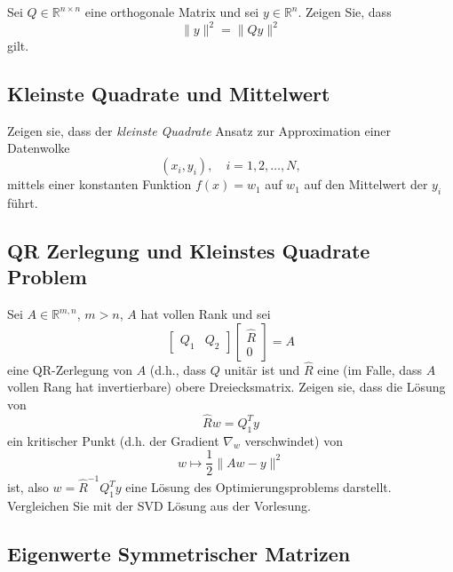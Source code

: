 \documentclass[
]{book}
\theoremstyle{definition}
\theoremstyle{definition}
\theoremstyle{definition}
\theoremstyle{definition}
\theoremstyle{remark}
\begin{document}
Sei \(Q\in \mathbb R^{n\times n}\) eine orthogonale Matrix und sei \(y\in \mathbb R^{n}\). Zeigen Sie, dass
\begin{equation*}
\|y\|^2 = \|Qy \|^2
\end{equation*}
gilt.

\hypertarget{kleinste-quadrate-und-mittelwert}{%
\subsection{Kleinste Quadrate und Mittelwert}\label{kleinste-quadrate-und-mittelwert}}

Zeigen sie, dass der \emph{kleinste Quadrate} Ansatz zur Approximation einer Datenwolke
\begin{equation*}
(x_i, y_i), \quad i=1,2,\dotsc,N,
\end{equation*}
mittels einer konstanten Funktion \(f(x)=w_1\) auf \(w_1\) auf den Mittelwert der \(y_i\) führt.

\hypertarget{qr-zerlegung-und-kleinstes-quadrate-problem}{%
\subsection{QR Zerlegung und Kleinstes Quadrate Problem}\label{qr-zerlegung-und-kleinstes-quadrate-problem}}

Sei \(A\in \mathbb R^{m,n}\), \(m>n\), \(A\) hat vollen Rank und sei
\begin{equation*}
\begin{bmatrix}
Q_1 & Q_2
\end{bmatrix}
\begin{bmatrix}
\hat R \\ 0
\end{bmatrix} = A
\end{equation*}
eine QR-Zerlegung von \(A\) (d.h., dass \(Q\) unitär ist und \(\hat R\) eine (im
Falle, dass \(A\) vollen Rang hat invertierbare) obere Dreiecksmatrix. Zeigen sie, dass die Lösung von
\begin{equation*}
\hat R w = Q_1^T y
\end{equation*}
ein kritischer Punkt (d.h. der Gradient \(\nabla_w\) verschwindet) von
\begin{equation*}
w \mapsto \frac 12 \| Aw - y \|^2
\end{equation*}
ist, also \(w=\hat R^{-1}Q_1^T y\) eine Lösung des Optimierungsproblems
darstellt. Vergleichen Sie mit der SVD Lösung aus der Vorlesung.

\hypertarget{eigenwerte-symmetrischer-matrizen}{%
\subsection{Eigenwerte Symmetrischer Matrizen}\label{eigenwerte-symmetrischer-matrizen}}
\end{document}
